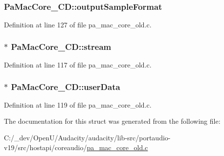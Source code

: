 \subsubsection[{\texorpdfstring{output\+Sample\+Format}{outputSampleFormat}}]{ Pa\+Mac\+Core\+\_\+\+C\+D\+::output\+Sample\+Format}\hypertarget{struct_pa_mac_core___c_d_a388dc2135e2232ba6159022bae522443}{}\label{struct_pa_mac_core___c_d_a388dc2135e2232ba6159022bae522443}


Definition at line 127 of file pa\+\_\+mac\+\_\+core\+\_\+old.\+c.

\subsubsection[{\texorpdfstring{stream}{stream}}]{$\ast$ Pa\+Mac\+Core\+\_\+\+C\+D\+::stream}\hypertarget{struct_pa_mac_core___c_d_af52f629e9fcb20d2f3086520fbaa6be4}{}\label{struct_pa_mac_core___c_d_af52f629e9fcb20d2f3086520fbaa6be4}


Definition at line 117 of file pa\+\_\+mac\+\_\+core\+\_\+old.\+c.

\subsubsection[{\texorpdfstring{user\+Data}{userData}}]{$\ast$ Pa\+Mac\+Core\+\_\+\+C\+D\+::user\+Data}\hypertarget{struct_pa_mac_core___c_d_acf9f9f10583107118ae4b745f0bb2c2a}{}\label{struct_pa_mac_core___c_d_acf9f9f10583107118ae4b745f0bb2c2a}


Definition at line 119 of file pa\+\_\+mac\+\_\+core\+\_\+old.\+c.



The documentation for this struct was generated from the following file\+:\begin{DoxyCompactItemize}
\item 
C\+:/\+\_\+dev/\+Open\+U/\+Audacity/audacity/lib-\/src/portaudio-\/v19/src/hostapi/coreaudio/\hyperlink{pa__mac__core__old_8c}{pa\+\_\+mac\+\_\+core\+\_\+old.\+c}\end{DoxyCompactItemize}

